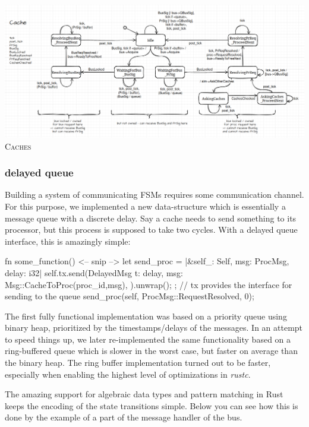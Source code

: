 \documentclass{article}
\begin{document}
\begin{center}
\includegraphics[width=18cm]{img/state_diagram_cache.png}
\textsc{Caches}
\end{center}

\begin{multicols}{2}

\subsubsection{delayed queue}

Building a system of communicating FSMs requires some communication channel. For this purpose, we implemented a new data-structure which is essentially a message queue with a discrete delay. Say a cache needs to send something to its processor, but this process is supposed to take two cycles. With a delayed queue interface, this is amazingly simple:

\begin{code}[Rust]{}
fn some_function() {
    <-- snip -->
    let send_proc = |&self_: Self, msg: ProcMsg, delay: i32| {
        self.tx.send(DelayedMsg {
            t: delay,
            msg: Msg::CacheToProc(proc_id,msg),
        }).unwrap();
    };
    // tx provides the interface for sending to the queue
    send_proc(self, ProcMsg::RequestResolved, 0);
}
\end{code}

The first fully functional implementation was based on a priority queue using binary heap, prioritized by the timestamps/delays of the messages. In an attempt to speed things up, we later re-implemented the same functionality based on a ring-buffered queue which is slower in the worst case, but faster on average than the binary heap. The ring buffer implementation turned out to be faster, especially when enabling the highest level of optimizations in \textit{rustc}.

The amazing support for algebraic data types and pattern matching in Rust keeps the encoding of the state transitions simple. Below you can see how this is done by the example of a part of the message handler of the bus.


\end{multicols}
\end{document}
